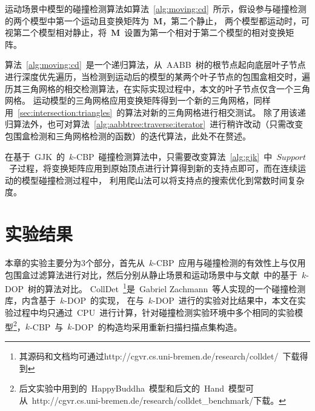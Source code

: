 \begin{algorithm}[!ht]
\end{algorithm}

运动场景中模型的碰撞检测算法如算法~\ref{alg:moving:cd}~所示，假设参与碰撞检测的两个模型中第一个运动且变换矩阵为~$\bm{M}$，第二个静止，
两个模型都运动时，可视第二个模型相对静止，将~$\bm{M}$~设置为第一个相对于第二个模型的相对变换矩阵。

算法~\ref{alg:moving:cd}~是一个递归算法，从~AABB~树的根节点起向底层叶子节点进行深度优先遍历，当检测到运动后的模型的某两个叶子节点的包围盒相交时，遍历其三角网格的相交检测算法，在实际实现过程中，本文的叶子节点仅含一个三角网格。
运动模型的三角网格应用变换矩阵得到一个新的三角网格，同样用~\ref{sec:intersection:triangles}~的算法对新的三角网格进行相交测试。
除了用该递归算法外，也可对算法~\ref{alg:aabbtree:traverse:iterator}~进行稍许改动（只需改变包围盒检测和三角网格检测的函数）的迭代算法，此处不在赘述。

在基于~GJK~的~$k$-CBP~碰撞检测算法中，只需要改变算法~\ref{alg:gjk}~中~$Support$~子过程，将变换矩阵应用到原始顶点进行计算得到新的支持点即可，而在连续运动的模型碰撞检测过程中，
利用爬山法可以将支持点的搜索优化到常数时间复杂度\cite{bergen1999fast}。

\FloatBarrier
\section{实验结果}
\label{sec:exper-cd}
本章的实验主要分为3个部分，首先从~$k$-CBP~应用与碰撞检测的有效性上与仅用包围盒过滤算法进行对比，然后分别从静止场景和运动场景中与文献~中的基于~$k$-DOP~树的算法对比。
CollDet~\footnote{其源码和文档均可通过http://cgvr.cs.uni-bremen.de/research/colldet/~下载得到}是~Gabriel Zachmann~等人实现的一个碰撞检测库\cite{abenchmarking2007}，内含基于~$k$-DOP~的实现，
在与~$k$-DOP~进行的实验对比结果中，本文在实验过程中均只通过~CPU~进行计算，针对碰撞检测实验环境中多个相同的实验模型\footnote{后文实验中用到的~HappyBuddha~模型和后文的~Hand~模型可从~http://cgvr.cs.uni-bremen.de/research/colldet\_benchmark/下载。}，$k$-CBP~与~$k$-DOP~的构造均采用重新扫描扫描点集构造。

